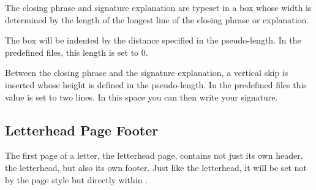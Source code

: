 \begin{Declaration}
\end{Declaration}
The closing phrase and signature
explanation are typeset in a box whose width is determined by the length of
the longest line of the closing phrase or explanation.

The box will be indented by the distance specified in the 
pseudo-length. In the predefined  files, this length is set to 0.

Between the closing phrase and the signature explanation, a vertical skip is
inserted whose height is defined in the 
pseudo-length. In the predefined  files this value is set to two lines. In this
space you can then write your signature.%
%
\EndIndexGroup
%
\EndIndexGroup


\subsection{Letterhead Page Footer}
%
\BeginIndexGroup
{}%

The first page of a letter, the letterhead page, contains not just its own
header, the letterhead, but also its own footer. Just like the letterhead, it will be set not by the page
style but directly within %
.



